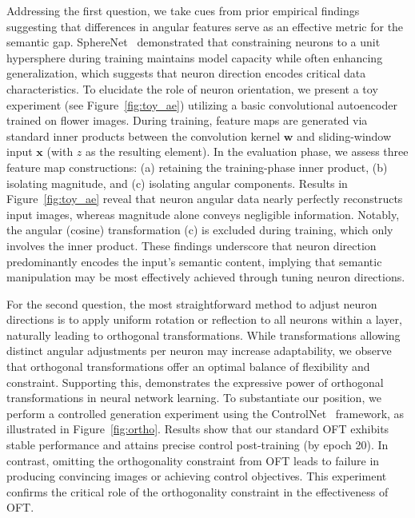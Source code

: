 Addressing the first question, we take cues from prior empirical findings \cite{liu2018decoupled,chen2020angular} suggesting that differences in angular features serve as an effective metric for the semantic gap. SphereNet~\cite{liu2017deep} demonstrated that constraining neurons to a unit hypersphere during training maintains model capacity while often enhancing generalization, which suggests that neuron direction encodes critical data characteristics. To elucidate the role of neuron orientation, we present a toy experiment (see Figure~\ref{fig:toy_ae}) utilizing a basic convolutional autoencoder trained on flower images. During training, feature maps are generated via standard inner products between the convolution kernel $\bm{w}$ and sliding-window input $\bm{x}$ (with $z$ as the resulting element). In the evaluation phase, we assess three feature map constructions: (a) retaining the training-phase inner product, (b) isolating magnitude, and (c) isolating angular components. Results in Figure~\ref{fig:toy_ae} reveal that neuron angular data nearly perfectly reconstructs input images, whereas magnitude alone conveys negligible information. Notably, the angular (cosine) transformation (c) is excluded during training, which only involves the inner product. These findings underscore that neuron direction predominantly encodes the input’s semantic content, implying that semantic manipulation may be most effectively achieved through tuning neuron directions.

For the second question, the most straightforward method to adjust neuron directions is to apply uniform rotation or reflection to all neurons within a layer, naturally leading to orthogonal transformations. While transformations allowing distinct angular adjustments per neuron may increase adaptability, we observe that orthogonal transformations offer an optimal balance of flexibility and constraint. Supporting this, \cite{liu2021orthogonal} demonstrates the expressive power of orthogonal transformations in neural network learning. To substantiate our position, we perform a controlled generation experiment using the ControlNet~\cite{zhang2023adding} framework, as illustrated in Figure~\ref{fig:ortho}. Results show that our standard OFT exhibits stable performance and attains precise control post-training (by epoch 20). In contrast, omitting the orthogonality constraint from OFT leads to failure in producing convincing images or achieving control objectives. This experiment confirms the critical role of the orthogonality constraint in the effectiveness of OFT.

